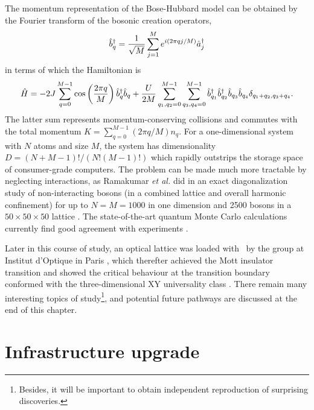 	The momentum representation of the Bose-Hubbard model can be obtained by the Fourier transform \cite{Zhang10} of the bosonic creation operators,
	\begin{equation}
		\hat{b}^\dagger_q = \frac{1}{\sqrt{M}}\sum_{j=1}^{M}e^{i(2\pi q j/M)}\hat{a}^\dagger_j
	\end{equation}
	in terms of which the Hamiltonian is
	\begin{equation}
		\hat{H} = -2J\sum_{q=0}^{M-1}\cos\left(\frac{2\pi q}{M}\right)\hat{b}^\dagger_q\hat{b}_q + \frac{U}{2M}\sum_{q_1,q_2=0}^{M-1}\sum_{q_3,q_4=0}^{M-1}\hat{b}^\dagger_{q_1}\hat{b}^\dagger_{q_2}\hat{b}_{q_3}\hat{b}_{q_4}\delta_{q_1+q_2,q_3+q_4}.
	\end{equation}
	The latter sum represents momentum-conserving collisions and commutes with the total momentum $K = \sum_{q=0}^{M-1}(2\pi q/M)n_q$.
	For a one-dimensional system with $N$ atoms and size $M$, the system has dimensionality $D = (N+M-1)!/(N!(M-1)!)$ which rapidly outstrips the storage space of consumer-grade computers.
	The problem can be made much more tractable by neglecting interactions, as Ramakumar \emph{et al.} did in an exact diagonalization study of non-interacting bosons (in a combined lattice and overall harmonic confinement) for up to $N=M=1000$ in one dimension and 2500 bosons in a $50\times50\times50$ lattice \cite{Ramakumar07}.
	The state-of-the-art quantum Monte Carlo calculations currently find good agreement with experiments \cite{Cayla18,Herce21}.


	Later in this course of study, an optical lattice was loaded with \mhe~by the group at Institut d'Optique in Paris \cite{Cayla18}, which therefter achieved the Mott insulator transition \cite{Carcy19} and showed the critical behaviour at the transition boundary conformed with the three-dimensional XY universality class \cite{Herce21}.
	There remain many interesting topics of study\footnote{Besides, it will be important to obtain independent reproduction of surprising discoveries.}, and potential future pathways are discussed at the end of this chapter.

\section{Infrastructure upgrade}


